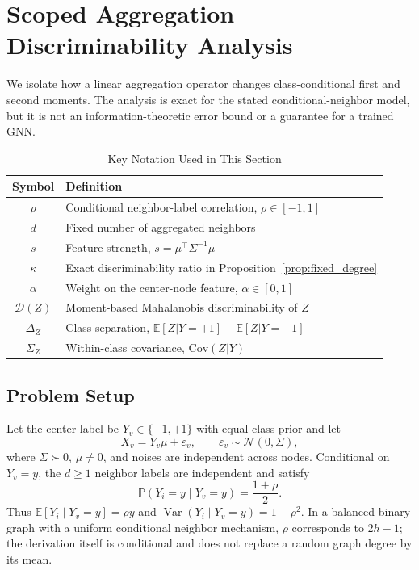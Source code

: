 
\section{Scoped Aggregation Discriminability Analysis}
\label{sec:snr}

We isolate how a linear aggregation operator changes class-conditional first and second moments. The analysis is exact for the stated conditional-neighbor model, but it is not an information-theoretic error bound or a guarantee for a trained GNN.

\begin{table}[t]
\centering
\caption{Key Notation Used in This Section}
\label{tab:notation}
\small
\begin{tabular}{@{}cl@{}}
\toprule
\textbf{Symbol} & \textbf{Definition} \\
\midrule
$\rho$ & Conditional neighbor-label correlation, $\rho\in[-1,1]$ \\
$d$ & Fixed number of aggregated neighbors \\
$s$ & Feature strength, $s=\mu^\top\Sigma^{-1}\mu$ \\
$\kappa$ & Exact discriminability ratio in Proposition~\ref{prop:fixed_degree} \\
$\alpha$ & Weight on the center-node feature, $\alpha\in[0,1]$ \\
$\mathcal{D}(Z)$ & Moment-based Mahalanobis discriminability of $Z$ \\
$\Delta_Z$ & Class separation, $\mathbb{E}[Z|Y=+1] - \mathbb{E}[Z|Y=-1]$ \\
$\Sigma_Z$ & Within-class covariance, $\mathrm{Cov}(Z|Y)$ \\
\bottomrule
\end{tabular}
\end{table}

\subsection{Problem Setup}

Let the center label be $Y_v\in\{-1,+1\}$ with equal class prior and let
\begin{equation}
    X_v=Y_v\mu+\varepsilon_v,
    \qquad \varepsilon_v\sim\mathcal{N}(0,\Sigma),
\end{equation}
where $\Sigma\succ0$, $\mu\neq0$, and noises are independent across nodes. Conditional on $Y_v=y$, the $d\geq1$ neighbor labels are independent and satisfy
\begin{equation}
    \mathbb{P}(Y_i=y\mid Y_v=y)=\frac{1+\rho}{2}.
\end{equation}
Thus $\mathbb{E}[Y_i\mid Y_v=y]=\rho y$ and $\operatorname{Var}(Y_i\mid Y_v=y)=1-\rho^2$. In a balanced binary graph with a uniform conditional neighbor mechanism, $\rho$ corresponds to $2h-1$; the derivation itself is conditional and does not replace a random graph degree by its mean.

